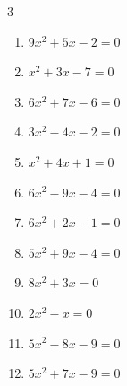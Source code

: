 \begin{multicols}{3}
\begin{enumerate}
  \item $9x^{2}+5x-2=0$


  \item $x^{2}+3x-7=0$


  \item $6x^{2}+7x-6=0$


  \item $3x^{2}-4x-2=0$


  \item $x^{2}+4x+1=0$


\columnbreak %

\resetques

  \item $6x^{2}-9x-4=0$


  \item $6x^{2}+2x-1=0$


  \item $5x^{2}+9x-4=0$


  \item $8x^{2}+3x=0$


  \item $2x^{2}-x=0$


  \item $5x^{2}-8x-9=0$


  \item $5x^{2}+7x-9=0$


\columnbreak %


\end{enumerate}
\end{multicols}
